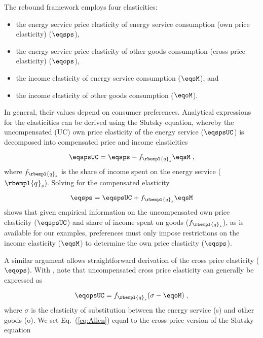 

The rebound framework employs four elasticities:
%
\begin{itemize}

  \item the energy service price elasticity of energy service consumption (own price elasticity) ($\eqsps$),

  \item the energy service price elasticity of other goods consumption (cross price elasticity) ($\eqops$), 
  
  \item the income elasticity of energy service consumption ($\eqsM$), and 
  
  \item the income elasticity of other goods consumption ($\eqoM$).

\end{itemize}
%
In general, their values depend on consumer preferences.
Analytical expressions for the elasticities can be derived using the Slutsky equation, 
whereby the uncompensated (UC) own price elasticity 
of the energy service ($\eqspsUC$) 
is decomposed into compensated price and income elasticities

\begin{equation}
  \eqspsUC = \eqsps - f_{\rbempl{q}_s} \eqsM \; ,
\end{equation}
%
where $f_{\rbempl{q}_s}$ is the share of income spent 
on the energy service ($\rbempl{q}_s$). 
Solving for the compensated elasticity 

\begin{equation} \label{eq:eqsps}
  \eqsps = \eqspsUC + f_{\rbempl{q}_s} \eqsM
\end{equation}
%
shows that given empirical information 
on the uncompensated own price elasticity ($\eqspsUC$) and
share of income spent on goods ($f_{\rbempl{q}_s}$), as is available for our examples, 
preferences must only impose restrictions 
on the income elasticity ($\eqsM$) to determine the own price elasticity ($\eqsps$).
 
A similar argument allows straightforward derivation 
of the cross price elasticity ($\eqops$).
With \citet{Hicks1934}, 
note that uncompensated cross price elasticity can generally be expressed as

\begin{equation} \label{eq:Allen}
  \eqopsUC = f_{\rbempl{q}_s} (\sigma - \eqoM) \; ,
\end{equation}
%
where $\sigma$ is the elasticity of substitution between the energy service (s) and other goods (o). 
We set Eq.~(\ref{eq:Allen}) equal to 
the cross-price version of the Slutsky equation

